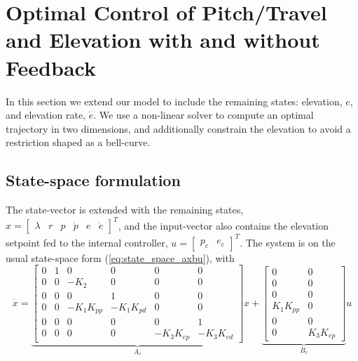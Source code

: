 \section{Optimal Control of Pitch/Travel and Elevation with and without Feedback}\label{sec:prob4}
In this section we extend our model to include the remaining states: elevation, $e$, and elevation
rate, $\dot{e}$. We use a non-linear solver to compute an optimal trajectory in two dimensions,
and additionally constrain the elevation to avoid a restriction shaped as a bell-curve.

\subsection{State-space formulation}
The state-vector is extended with the remaining states, $x = \begin{bmatrix} \lambda & r & p & \dot{p} & e & \dot{e} \end{bmatrix}^T$, and the input-vector also contains the elevation setpoint fed to the internal controller, $u = \begin{bmatrix} p_c & e_c \end{bmatrix}^T$. The system is on the usual state-space form (\ref{eq:state_space_axbu}),
with
\begin{equation}
    \dot{x} =
    \underbrace{
    \begin{bmatrix}
    0 & 1 &      0     &      0     &      0     &      0    \\
    0 & 0 &    -K_2    &      0     &      0     &      0    \\
    0 & 0 &      0     &      1     &      0     &      0    \\
    0 & 0 & -K_1K_{pp} & -K_1K_{pd} &      0     &      0    \\
    0 & 0 &      0     &      0     &      0     &      1    \\
    0 & 0 &      0     &      0     & -K_3K_{ep} & -K_3K_{ed}
    \end{bmatrix}}_{A_c}
    x +
    \underbrace{
    \begin{bmatrix}
        0       &     0     \\
        0       &     0     \\
        0       &     0     \\
    K_1K_{pp}   &     0     \\
        0       &     0     \\
        0       & K_3K_{ep}
    \end{bmatrix}}_{B_c}
    u
    \label{eq:extended_state_space}
\end{equation}

